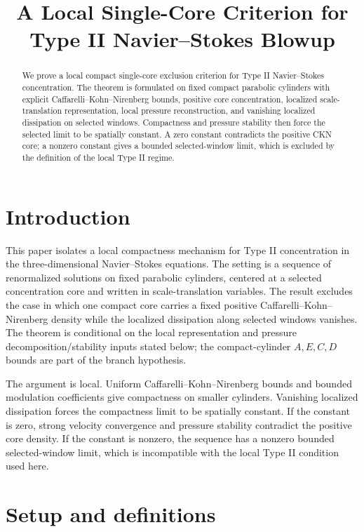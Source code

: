 \documentclass[11pt]{amsart}
\title[Local Single-Core Type II Criterion]{A Local Single-Core Criterion for Type II Navier--Stokes Blowup}
\author{}
\date{}
\theoremstyle{plain}
\theoremstyle{definition}
\theoremstyle{remark}
\begin{document}
\begin{abstract}
We prove a local compact single-core exclusion criterion for Type II
Navier--Stokes concentration.  The theorem is formulated on fixed compact
parabolic cylinders with explicit Caffarelli--Kohn--Nirenberg bounds, positive
core concentration, localized scale-translation representation, local pressure
reconstruction, and vanishing localized dissipation on selected windows.
Compactness and pressure stability then force
the selected limit to be spatially constant.  A zero constant contradicts the
positive CKN core; a nonzero constant gives a bounded selected-window limit, which
is excluded by the definition of the local Type II regime.
\end{abstract}

\maketitle

\section{Introduction}

This paper isolates a local compactness mechanism for Type II concentration in
the three-dimensional Navier--Stokes equations.  The setting is a sequence of
renormalized solutions on fixed parabolic cylinders, centered at a selected
concentration core and written in scale-translation variables.  The result
excludes the case in which one compact core carries a fixed positive
Caffarelli--Kohn--Nirenberg density while the localized dissipation along
selected windows vanishes.  The theorem is conditional on the local
representation and pressure decomposition/stability inputs stated below; the
compact-cylinder \(A,E,C,D\) bounds are part of the branch hypothesis.

The argument is local.  Uniform Caffarelli--Kohn--Nirenberg bounds and bounded
modulation coefficients give compactness on smaller cylinders.  Vanishing
localized dissipation forces the compactness limit to be spatially constant.
If the constant is zero, strong velocity convergence and pressure stability
contradict the positive core density.  If the constant is nonzero, the sequence
has a nonzero bounded selected-window limit, which is incompatible with the local
Type II condition used here.

\section{Setup and definitions}
\end{document}
